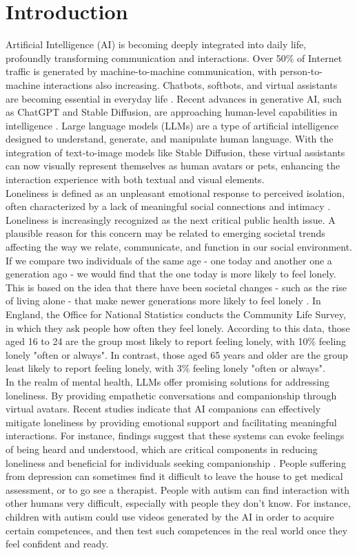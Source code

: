 \section{Introduction}
Artificial Intelligence (AI) is becoming deeply integrated into daily life, profoundly transforming communication and interactions. Over 50\% of Internet traffic is generated by machine-to-machine communication, with person-to-machine interactions also increasing. Chatbots, softbots, and virtual assistants are becoming essential in everyday life \cite{elliott2019culture}. Recent advances in generative AI, such as ChatGPT and Stable Diffusion, are approaching human-level capabilities in intelligence \cite{orru2023human}. Large language models (LLMs) are a type of artificial intelligence designed to understand, generate, and manipulate human language. With the integration of text-to-image models like Stable Diffusion, these virtual assistants can now visually represent themselves as human avatars or pets, enhancing the interaction experience with both textual and visual elements. \\
Loneliness is defined as an unpleasant emotional response to perceived isolation, often characterized by a lack of meaningful social connections and intimacy \cite{lonelinessWiki}. Loneliness is increasingly recognized as the next critical public health issue. A plausible reason for this concern may be related to emerging societal trends affecting the way we relate, communicate, and function in our social environment. If we compare two individuals of the same age - one today and another one a generation ago - we would find that the one today is more likely to feel lonely. This is based on the idea that there have been societal changes - such as the rise of living alone - that make newer generations more likely to feel lonely \cite{owid-loneliness-epidemic}. In England, the Office for National Statistics conducts the Community Life Survey, in which they ask people how often they feel lonely. According to this data, those aged 16 to 24 are the group most likely to report feeling lonely, with 10\% feeling lonely "often or always". In contrast, those aged 65 years and older are the group least likely to report feeling lonely, with 3\% feeling lonely "often or always". \\
In the realm of mental health, LLMs offer promising solutions for addressing loneliness. By providing empathetic conversations and companionship through virtual avatars. Recent studies indicate that AI companions can effectively mitigate loneliness by providing emotional support and facilitating meaningful interactions. For instance, findings suggest that these systems can evoke feelings of being heard and understood, which are critical components in reducing loneliness \cite{strohmann2023toward} and beneficial for individuals seeking companionship \cite{odekerken2020mitigating}. People suffering from depression can sometimes find it difficult to leave the house to get medical assessment, or to go see a therapist. People with autism can find interaction with other humans very difficult, especially with people they don't know. For instance, children with autism could use videos generated by the AI in order to acquire certain competences, and then test such competences in the real world once they feel confident and ready.
